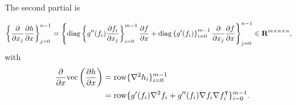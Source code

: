 \documentclass{article}
\begin{document}
        The second partial is
    
        \begin{align*}
            \left\{\frac{\partial }{\partial x_j}\frac{\partial h}{\partial x}\right\}_{j=0}^{n-1}&=
            \left\{\text{diag}\left\{g''(f_i)\frac{\partial f_i}{\partial x_j}\right\}_{i=0}^{m-1}\frac{\partial f}{\partial x}
            +\text{diag}\left\{g'(f_i)\right\}_{i=0}^{m-1}\frac{\partial }{\partial x_j}\frac{\partial f}{\partial x}\right\}_{j=0}^{n-1}\in\textbf{R}^{m\times n\times n},
        \end{align*}
        with
        \begin{align*}
            \frac{\partial }{\partial x}\mathrm{vec}\left(\frac{\partial h}{\partial x}\right)&=\text{row}\{\nabla^2 h_i\}_{i=0}^{m-1}\\
            &=\text{row}\{g'(f_i)\nabla^2f_i+g''(f_i)\nabla f_i\nabla f_i^\intercal\}_{i=0}^{m-1}.
        \end{align*}

\end{document}
